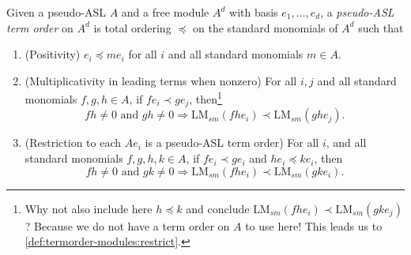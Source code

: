 \documentclass[11pt,reqno]{amsart}
\newcommand{\lmsm}{\text{LM}_{sm}}
\theoremstyle{definition}
\numberwithin{equation}{section}
\begin{document}
\begin{definition} 
\label{def:termorder-modules} 
Given a pseudo-ASL $A$ and a free module $A^d$ with basis $e_1, \dotsc, e_d$, a \emph{pseudo-ASL term order} on $A^d$ is total ordering $\preceq$ on the standard monomials of $A^d$ such that 

\begin{enumerate}[label=(\textbf{MATO-\arabic*}),ref=(\textbf{MATO-\arabic*})]
\item \label{def:termorder-modules:positive} (Positivity) $e_i \preceq m e_i$ for all $i$ and all standard monomials $m \in A$.

\item \label{def:termorder-modules:mult} (Multiplicativity in leading terms when nonzero) For all $i,j$ and all standard monomials $f,g,h \in A$, if $f e_i \prec g e_j$, then\footnote{Why not also include here $h \preceq k$ and conclude $\lmsm(fh e_i) \prec \lmsm(gk e_j)$? Because we do not have a term order on $A$ to use here! This leads us to \ref{def:termorder-modules:restrict}.}
\[
fh \neq 0 \text{ and } gh \neq 0 \Longrightarrow \lmsm(fh e_i) \prec \lmsm(gh e_j).
\]
\item \label{def:termorder-modules:restrict} (Restriction to each $Ae_i$ is a pseudo-ASL term order) For all $i$, and all standard monomials $f,g,h,k \in A$, if $f e_i \prec g e_i$ and $h e_i \preceq k e_i$, then 
\[
fh \neq 0 \text{ and } gk \neq 0 \Longrightarrow \lmsm(fh e_i) \prec \lmsm(gk e_i).
\]
\end{enumerate}
\end{definition}
\end{document}
